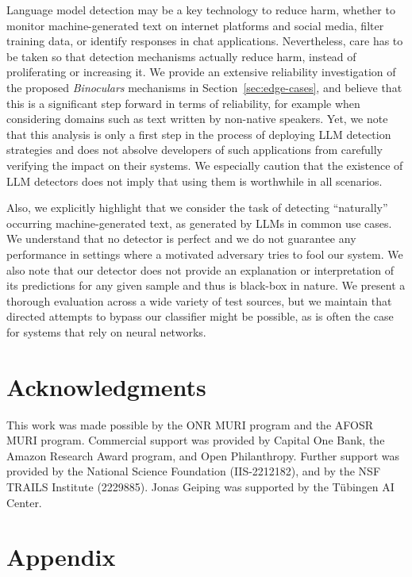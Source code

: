 \documentclass{article} %
\begin{document}
Language model detection may be a key technology to reduce harm, whether to monitor machine-generated text on internet platforms and social media, filter training data, or identify responses in chat applications. 
Nevertheless, care has to be taken so that detection mechanisms actually reduce harm, instead of proliferating or increasing it. 
We provide an extensive reliability investigation of the proposed \textit{Binoculars} mechanisms in Section~\ref{sec:edge-cases}, and believe that this is a significant step forward in terms of reliability, for example when considering domains such as text written by non-native speakers. 
Yet, we note that this analysis is only a first step in the process of deploying LLM detection strategies and does not absolve developers of such applications from carefully verifying the impact on their systems. 
We especially caution that the existence of LLM detectors does not imply that using them is worthwhile in all scenarios. 
 
Also, we explicitly highlight that we consider the task of detecting ``naturally'' occurring machine-generated text, as generated by LLMs in common use cases. 
We understand that no detector is perfect and we do not guarantee any performance in settings where a motivated adversary tries to fool our system. We also note that our detector does not provide an explanation or interpretation of its predictions for any given sample and thus is black-box in nature.
We present a thorough evaluation across a wide variety of test sources, but we maintain that directed attempts to bypass our classifier might be possible, as is often the case for systems that rely on neural networks. 

\section*{Acknowledgments}
This work was made possible by the ONR MURI program and the AFOSR MURI program. Commercial support was provided by Capital One Bank, the Amazon Research Award program, and Open Philanthropy. Further support was provided by the National Science Foundation (IIS-2212182), and by the NSF TRAILS Institute (2229885). Jonas Geiping was supported by the Tübingen AI Center.





\appendix
\onecolumn
\section{Appendix}
\end{document}
